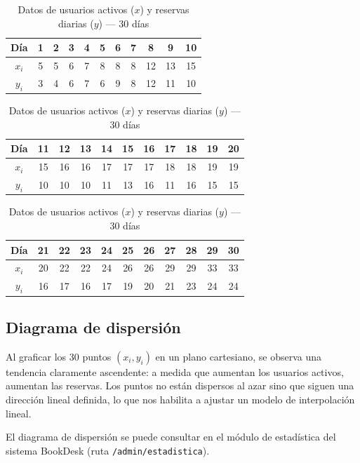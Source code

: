 \documentclass[12pt,a4paper]{article}
\begin{document}
\vspace{6pt}
\begin{table}[H]
\centering
\caption{Datos de usuarios activos ($x$) y reservas diarias ($y$) — 30 días}
\vspace{4pt}
\begin{tabular}{c|cccccccccc}
\toprule
\textbf{Día} & 1 & 2 & 3 & 4 & 5 & 6 & 7 & 8 & 9 & 10 \\
\midrule
$x_i$ & 5 & 5 & 6 & 7 & 8 & 8 & 8 & 12 & 13 & 15 \\
$y_i$ & 3 & 4 & 6 & 7 & 6 & 9 & 8 & 12 & 11 & 10 \\
\bottomrule
\end{tabular}

\vspace{8pt}

\begin{tabular}{c|cccccccccc}
\toprule
\textbf{Día} & 11 & 12 & 13 & 14 & 15 & 16 & 17 & 18 & 19 & 20 \\
\midrule
$x_i$ & 15 & 16 & 16 & 17 & 17 & 17 & 18 & 18 & 19 & 19 \\
$y_i$ & 10 & 10 & 10 & 11 & 13 & 16 & 11 & 16 & 15 & 15 \\
\bottomrule
\end{tabular}

\vspace{8pt}

\begin{tabular}{c|cccccccccc}
\toprule
\textbf{Día} & 21 & 22 & 23 & 24 & 25 & 26 & 27 & 28 & 29 & 30 \\
\midrule
$x_i$ & 20 & 22 & 22 & 24 & 26 & 26 & 29 & 29 & 33 & 33 \\
$y_i$ & 16 & 17 & 16 & 17 & 19 & 20 & 21 & 23 & 24 & 24 \\
\bottomrule
\end{tabular}
\end{table}

\subsection{Diagrama de dispersión}

Al graficar los 30 puntos $(x_i, y_i)$ en un plano cartesiano, se observa una tendencia claramente ascendente: a medida que aumentan los usuarios activos, aumentan las reservas. Los puntos no están dispersos al azar sino que siguen una dirección lineal definida, lo que nos habilita a ajustar un modelo de interpolación lineal.

El diagrama de dispersión se puede consultar en el módulo de estadística del sistema BookDesk (ruta \texttt{/admin/estadistica}).
\end{document}
